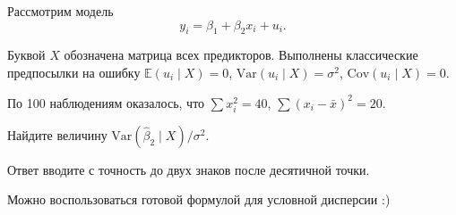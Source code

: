 
\begin{question}
Рассмотрим модель
\[
y_i = \beta_1 + \beta_2 x_i + u_i.
\]

Буквой \(X\) обозначена матрица всех предикторов.
Выполнены классические предпосылки на ошибку \(\mathbb E(u_i \mid X) = 0\), \(\mathrm{Var}(u_i \mid X) = \sigma^2\), \(\mathrm{Cov}(u_i \mid X) = 0\).

По 100 наблюдениям оказалось, что \(\sum x_i^2 = 40\), \(\sum (x_i - \bar x)^2 = 20\).

Найдите величину \(\mathrm{Var}(\hat \beta_2 \mid X) / \sigma^2\).

Ответ вводите с точность до двух знаков после десятичной точки.
\end{question}

\begin{solution}
Можно воспользоваться готовой формулой для условной дисперсии :)
\end{solution}


